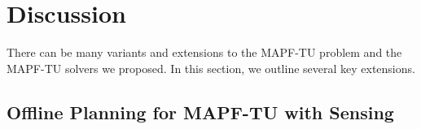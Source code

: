 \documentclass[jair,twoside,11pt,theapa]{article}
\newcommand{\mapftu}{MAPF-TU\xspace}
\begin{document}







\section{Discussion}
\label{sec:discussion}
There can be many variants and extensions to the \mapftu problem and the \mapftu solvers we proposed. In this section, we outline several key extensions. 


\subsection{Offline Planning for MAPF-TU with Sensing}
\end{document}
